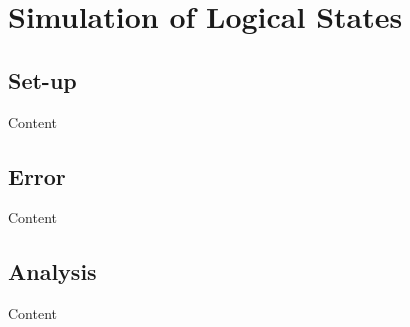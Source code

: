 
\chapter{Simulation of Logical States} %

\label{ch:sim_log} %


\section{Set-up}

Content


\section{Error}

Content


\section{Analysis}

Content